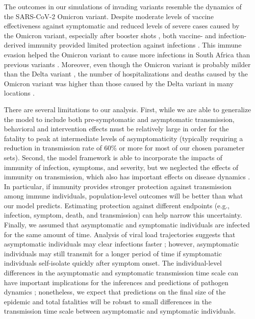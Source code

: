 \documentclass[12pt]{article}
\begin{document}
The outcomes in our simulations of invading variants resemble the dynamics of the SARS-CoV-2 Omicron variant.
Despite moderate levels of vaccine effectiveness against symptomatic and reduced levels of severe cases caused by the Omicron variant, especially after booster shots \citep{andres2022omicron}, both vaccine- and infection-derived immunity provided limited protection against infections \citep{pearson2021omicron}.
This immune evasion helped the Omicron variant to cause more infections in South Africa than previous variants \citep{sun2022omicron}.
Moreover, even though the Omicron variant is probably milder than the Delta variant \citep{MENNI20221618,ulloa2022estimates}, the number of hospitalizations and deaths caused by the Omicron variant was higher than those caused by the Delta variant in many locations \citep{Iacobuccio254,faust2022omicron,sigal2022estimating}.

There are several limitations to our analysis.
First, while we are able to generalize the model to include both pre-symptomatic and asymptomatic transmission, behavioral and intervention effects must be relatively large in order for the fatality to peak at intermediate levels of asymptomaticity (typically requiring a reduction in transmission rate of 60\% or more for most of our chosen parameter sets).
Second, the model framework is able to incorporate the impacts of immunity of infection, symptoms, and severity,
but we neglected the effects of immunity on transmission, which also has important effects on disease dynamics \citep{saad2020immune,gallagher2021indirect}.
In particular, if immunity provides stronger protection against transmission among immune individuals, population-level outcomes will be better than what our model predicts.
Estimating protection against different endpoints (e.g., infection, symptom, death, and transmission) can help narrow this uncertainty.
Finally, we assumed that asymptomatic and symptomatic individuals are infected for the same amount of time.
Analysis of viral load trajectories suggests that asymptomatic individuals may clear infections faster \citep{Kissler2020};
however, asymptomatic individuals may still transmit for a longer period of time if symptomatic individuals self-isolate quickly after symptom onset.
The individual-level differences in the asymptomatic and symptomatic transmission time scale can have important implications for the inferences and predictions of pathogen dynamics \citep{park2020time,harris2022time};
nonetheless, we expect that predictions on the final size of the epidemic and total fatalities will be robust to small differences in the transmission time scale between asymptomatic and symptomatic individuals.
\end{document}
